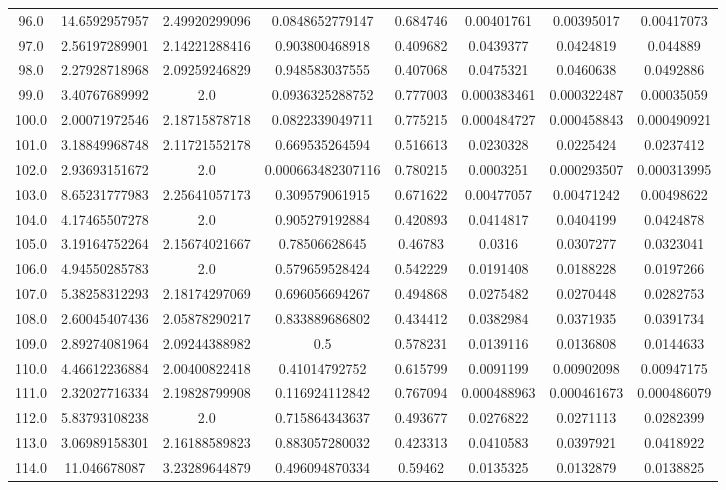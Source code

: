 \begin{longtable}{|c|c|c|c|c|c|c|c|}
96.0 & 14.6592957957 & 2.49920299096 & 0.0848652779147 & 0.684746 & 0.00401761 & 0.00395017 & 0.00417073 \\
97.0 & 2.56197289901 & 2.14221288416 & 0.903800468918 & 0.409682 & 0.0439377 & 0.0424819 & 0.044889 \\
98.0 & 2.27928718968 & 2.09259246829 & 0.948583037555 & 0.407068 & 0.0475321 & 0.0460638 & 0.0492886 \\
99.0 & 3.40767689992 & 2.0 & 0.0936325288752 & 0.777003 & 0.000383461 & 0.000322487 & 0.00035059 \\
100.0 & 2.00071972546 & 2.18715878718 & 0.0822339049711 & 0.775215 & 0.000484727 & 0.000458843 & 0.000490921 \\
101.0 & 3.18849968748 & 2.11721552178 & 0.669535264594 & 0.516613 & 0.0230328 & 0.0225424 & 0.0237412 \\
102.0 & 2.93693151672 & 2.0 & 0.000663482307116 & 0.780215 & 0.0003251 & 0.000293507 & 0.000313995 \\
103.0 & 8.65231777983 & 2.25641057173 & 0.309579061915 & 0.671622 & 0.00477057 & 0.00471242 & 0.00498622 \\
104.0 & 4.17465507278 & 2.0 & 0.905279192884 & 0.420893 & 0.0414817 & 0.0404199 & 0.0424878 \\
105.0 & 3.19164752264 & 2.15674021667 & 0.78506628645 & 0.46783 & 0.0316 & 0.0307277 & 0.0323041 \\
106.0 & 4.94550285783 & 2.0 & 0.579659528424 & 0.542229 & 0.0191408 & 0.0188228 & 0.0197266 \\
107.0 & 5.38258312293 & 2.18174297069 & 0.696056694267 & 0.494868 & 0.0275482 & 0.0270448 & 0.0282753 \\
108.0 & 2.60045407436 & 2.05878290217 & 0.833889686802 & 0.434412 & 0.0382984 & 0.0371935 & 0.0391734 \\
109.0 & 2.89274081964 & 2.09244388982 & 0.5 & 0.578231 & 0.0139116 & 0.0136808 & 0.0144633 \\
110.0 & 4.46612236884 & 2.00400822418 & 0.41014792752 & 0.615799 & 0.0091199 & 0.00902098 & 0.00947175 \\
111.0 & 2.32027716334 & 2.19828799908 & 0.116924112842 & 0.767094 & 0.000488963 & 0.000461673 & 0.000486079 \\
112.0 & 5.83793108238 & 2.0 & 0.715864343637 & 0.493677 & 0.0276822 & 0.0271113 & 0.0282399 \\
113.0 & 3.06989158301 & 2.16188589823 & 0.883057280032 & 0.423313 & 0.0410583 & 0.0397921 & 0.0418922 \\
114.0 & 11.046678087 & 3.23289644879 & 0.496094870334 & 0.59462 & 0.0135325 & 0.0132879 & 0.0138825 \\

\end{longtable}

